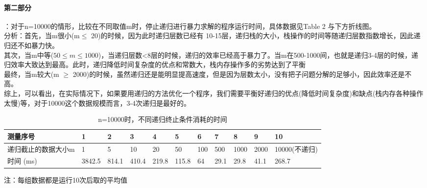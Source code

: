 \documentclass{article}
\begin{document}
\begin{CJK}{UTF8}{gkai}
\paragraph{第二部分}：对于n=10000的情形，比较在不同取值m时，停止递归进行暴力求解的程序运行时间，具体数据见Table 2 与下方折线图。\\
分析：首先，当m很小(m$\leq$ 20)的时候，因为此时递归层数已经有 10-15层，递归栈的大小，栈操作的时间等随递归层数指数增长，因此递归还不如暴力快。\\
其次，当m中等($50\leq m\leq 1000$)，当递归层数<8层的时候，递归的效率已经高于暴力了。当m在500-1000间，也就是递归3-4层的时候，递归效率大致达到最高。此时，递归降低时间复杂度的优点和常数大，栈内存操作多的劣势达到了平衡\\
最终，当m较大(m $\geq$ 2000)的时候，虽然递归还是能明显提高速度，但是因为层数太小，没有把子问题分解的足够小，因此效率还是不高。\\
综上，可以看出，在实际情况下，如果要用递归的方法优化一个程序，我们需要平衡好递归的优点(降低时间复杂度)和缺点(栈内存各种操作太慢)等，对于10000这个数据规模而言，3-4次递归是最好的。



\begin{table}[!htbp] 
	
	\caption{n=10000时，不同递归终止条件消耗的时间}
	\begin{flushleft} 
		\begin{tabular}{|l|l|l|l|l|l|l|l|l|l|l|} 
			\hline 测量序号 & 1 & 2 & 3 & 4 & 5 & 6 & 7 & 8& 9&10\\ 
			\hline 递归截止的数据大小m &1&5&10&20&50&100&500&1000&2000&10000(不递归) \\ 
			\hline 时间 (ms)
			&3842.5&814.1&410.4&219.8&115.8&64&29.1&29.8&41.1&268.7  \\ 
			\hline 
		\end{tabular} 
		注：每组数据都是运行10次后取的平均值
	\end{flushleft} 
\end{table}


\pgfplotsset{}



\end{CJK}
\end{document}
